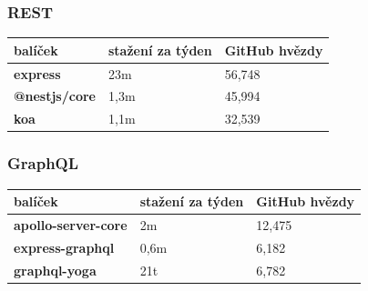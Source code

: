 \documentclass[thesis=M,czech]{FITthesis}[2019/12/23]
\begin{document}
\subsubsection*{REST}
\begin{table}[H]
  \begin{tabular}{|l|l|l|}
  \hline
  \textbf{balíček}      & \textbf{stažení za týden} & \textbf{GitHub hvězdy} \\ \hline
  \textbf{express}      & 23m                       & 56,748                 \\ \hline
  \textbf{@nestjs/core} & 1,3m                      & 45,994                 \\ \hline
  \textbf{koa}          & 1,1m                      & 32,539                 \\ \hline
  \end{tabular}
\end{table}

\subsubsection*{GraphQL}
\begin{table}[H]
  \begin{tabular}{|l|l|l|}
  \hline
  \textbf{balíček}                                 & \textbf{stažení za týden}                           & \textbf{GitHub hvězdy} \\ \hline
  \textbf{apollo-server-core}                      & 2m                                                  & 12,475                 \\ \hline
  \textbf{express-graphql}                         & 0,6m                                                & 6,182                  \\ \hline
  \textbf{graphql-yoga}                            & 21t                                                 & 6,782                  \\ \hline
  \end{tabular}
\end{table}
\end{document}
